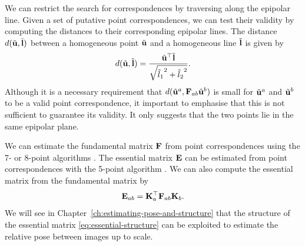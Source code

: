 We can restrict the search for correspondences by traversing along the epipolar line.
Given a set of putative point correspondences, we can test their validity by computing the distances to their corresponding epipolar lines.
The distance $d(\tilde{{\boldsymbol{\mathbf{u}}}}, \tilde{{\boldsymbol{\mathbf{l}}}})$ between a homogeneous point $\tilde{{\boldsymbol{\mathbf{u}}}}$ and a homogeneous line $\tilde{{\boldsymbol{\mathbf{l}}}}$ is given by
\begin{equation}
  d(\tilde{{\boldsymbol{\mathbf{u}}}}, \tilde{{\boldsymbol{\mathbf{l}}}}) = \frac{\tilde{{\boldsymbol{\mathbf{u}}}}^{\top} \tilde{{\boldsymbol{\mathbf{l}}}}}{\sqrt{{\tilde{l}_1}^2 + {\tilde{l}_2}^2}}.
\end{equation}
Although it is a necessary requirement that $d(\tilde{{\boldsymbol{\mathbf{u}}}}^a, {\boldsymbol{\mathbf{F}}}_{ab} \tilde{{\boldsymbol{\mathbf{u}}}}^b)$ is small for $\tilde{{\boldsymbol{\mathbf{u}}}}^a$ and $\tilde{{\boldsymbol{\mathbf{u}}}}^b$ to be a valid point correspondence, it important to emphasise that this is not sufficient to guarantee its validity.
It only suggests that the two points lie in the same epipolar plane.

We can estimate the fundamental matrix ${\boldsymbol{\mathbf{F}}}$ from point correspondences using the 7- or 8-point algorithms \cite{Hartley2004MultipleVision}.
The essential matrix ${\boldsymbol{\mathbf{E}}}$ can be estimated from point correspondences with the 5-point algorithm \cite{Nister2004AnProblem}.
We can also compute the essential matrix from the fundamental matrix by
\begin{align}
  {\boldsymbol{\mathbf{E}}}_{ab} = {\boldsymbol{\mathbf{K}}}_a^{\top} {\boldsymbol{\mathbf{F}}}_{ab} {\boldsymbol{\mathbf{K}}}_b.
\end{align}
We will see in Chapter~\ref{ch:estimating-pose-and-structure} that the structure of the essential matrix \eqref{eq:essential-structure} can be exploited to estimate the relative pose between images up to scale.

